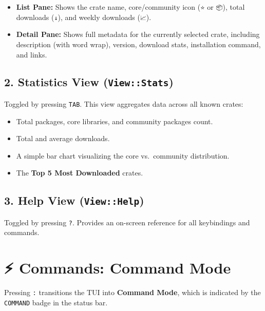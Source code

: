 \documentclass[
  letterpaper,
  DIV=11,
  numbers=noendperiod]{scrreprt}
\providecommand{\tightlist}{%
  \setlength{\itemsep}{0pt}\setlength{\parskip}{0pt}}
\begin{document}
\begin{itemize}
\tightlist
\item
  \textbf{List Pane:} Shows the crate name, core/community icon
  (\texttt{⭐} or \texttt{📦}), total downloads (\texttt{↓}), and weekly
  downloads (\texttt{📈}).
\item
  \textbf{Detail Pane:} Shows full metadata for the currently selected
  crate, including description (with word wrap), version, download
  stats, installation command, and links.
\end{itemize}

\subsection{\texorpdfstring{2. Statistics View
(\texttt{View::Stats})}{2. Statistics View (View::Stats)}}\label{statistics-view-viewstats}

Toggled by pressing \texttt{TAB}. This view aggregates data across all
known crates:

\begin{itemize}
\tightlist
\item
  Total packages, core libraries, and community packages count.
\item
  Total and average downloads.
\item
  A simple bar chart visualizing the core vs.~community distribution.
\item
  The \textbf{Top 5 Most Downloaded} crates.
\end{itemize}

\subsection{\texorpdfstring{3. Help View
(\texttt{View::Help})}{3. Help View (View::Help)}}\label{help-view-viewhelp}

Toggled by pressing \texttt{?}. Provides an on-screen reference for all
keybindings and commands.

\section{⚡ Commands: Command Mode}\label{commands-command-mode}

Pressing \texttt{:} transitions the TUI into \textbf{Command Mode},
which is indicated by the \texttt{COMMAND} badge in the status bar.
\end{document}
